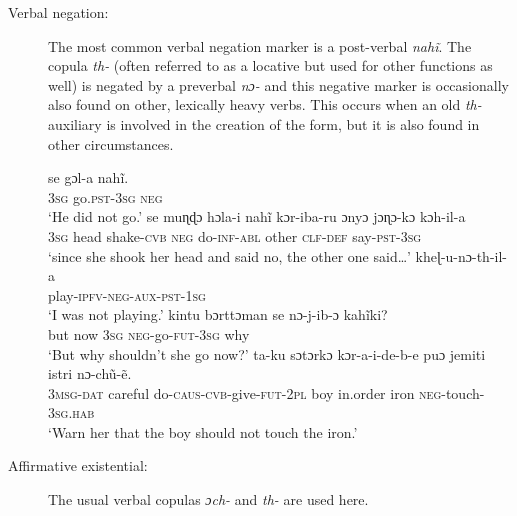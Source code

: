 \documentclass[output=paper,colorlinks,citecolor=brown]{langscibook}
\begin{document}
\begin{paperappendix}
\begin{unindented}
\begin{description}
\item[Verbal negation:] The most common verbal negation marker is a post-verbal \textit{nahĩ}. The copula \textit{th-} (often referred to as a locative but used for other functions as well) is negated by a preverbal \textit{nɔ-} and this negative marker is occasionally also found on other, lexically heavy verbs. This occurs when an old \textit{th-} auxiliary is involved in the creation of the form, but it is also found in other circumstances.
%
\begin{exe}\ex \gll se gɔl-a nahĩ. \\
\textsc{3sg}   go.\textsc{pst-3sg}  \textsc{neg} \\
    \glt `He did not go.' \parencite[340]{NeukomPatnaik2003}
\ex \gll se muɳɖɔ hɔla-i nahĩ kɔr-iba-ru ɔnyɔ jɔɳɔ-kɔ kɔh-il-a \\
\textsc{3sg} head shake-\textsc{cvb} \textsc{neg} do-\textsc{inf-abl} other \textsc{clf-def} say-\textsc{pst-3sg} \\
    \glt `since she shook her head and said no, the other one
said…'\parencite[43]{NeukomPatnaik2003}
\ex \gll kheɭ-u-nɔ-th-il-a \\
play-\textsc{ipfv-neg-aux-pst-1sg} \\
    \glt `I was not playing.' \parencite[340]{NeukomPatnaik2003}
\ex \gll kintu bɔrttɔman se nɔ-j-ib-ɔ kahĩki?\\
but now \textsc{3sg} \textsc{neg}-go-\textsc{fut-3sg} why \\
    \glt `But why shouldn't she go now?’ \parencite[341]{NeukomPatnaik2003}
\ex \gll ta-ku sɔtɔrkɔ kɔr-a-i-de-b-e puɔ jemiti istri nɔ-chũ-ẽ.\\
\textsc{3msg-dat} careful do-\textsc{caus-cvb}-give-\textsc{fut-2pl} boy in.order iron \textsc{neg}-touch-\textsc{3sg.hab} \\
    \glt `Warn her that the boy should not touch the iron.' \parencite[155]{NeukomPatnaik2003}
    \end{exe}

\item[Affirmative existential:] The usual verbal copulas \textit{ɔch-} and \textit{th-} are used here.


\end{description}
\end{unindented}
\end{paperappendix}
\end{document}
